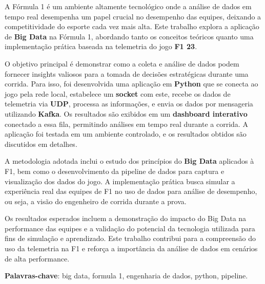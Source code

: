 \documentclass[12pt, %
openright, 
oneside, %
a4paper,    %
brazil]{facom-ufu-abntex2}
\begin{document}
\begin{resumo} %

  A Fórmula 1 é um ambiente altamente tecnológico onde a análise de dados em 
  tempo real desempenha um papel crucial no desempenho das equipes, deixando a competitividade do esporte
  cada vez mais alta. Este trabalho explora a aplicação de \textbf{Big Data} na Fórmula 1, abordando tanto os conceitos teóricos 
  quanto uma implementação prática baseada na telemetria do jogo \textbf{F1 23}.
  
  O objetivo principal é demonstrar como a coleta e análise de dados podem fornecer insights valiosos para 
  a tomada de decisões estratégicas durante uma corrida. Para isso, foi desenvolvida uma aplicação em \textbf{Python} 
  que se conecta ao jogo pela rede local, estabelece um \textbf{socket} com este, recebe os dados de telemetria via \textbf{UDP}, 
  processa as informações, e envia os dados por mensageria utilizando \textbf{Kafka}. Os resultados são exibidos em um 
  \textbf{dashboard interativo} conectado a essa fila, permitindo análises em tempo real durante a corrida. 
  A aplicação foi testada em um ambiente controlado, e os resultados obtidos são discutidos em detalhes.
  
  A metodologia adotada inclui o estudo dos princípios do \textbf{Big Data} aplicados à F1, bem como o desenvolvimento 
  da pipeline de dados para captura e visualização dos dados do jogo. A implementação prática busca simular a experiência 
  real das equipes de F1 no uso de dados para análise de desempenho, ou seja, a visão do engenheiro de corrida durante a prova.

  Os resultados esperados incluem a demonstração do impacto do Big Data na performance das equipes e a 
  validação do potencial da tecnologia utilizada para fins de simulação e aprendizado. Este trabalho contribui 
  para a compreensão do uso da telemetria na F1 e reforça a importância da análise de dados em cenários de alta performance.

 \vspace{\onelineskip}
    
 \noindent
 \textbf{Palavras-chave}: big data, formula 1, engenharia de dados, python, pipeline. %
\end{resumo}

\listoffigures*
\cleardoublepage

\listoftables*
\cleardoublepage
\end{document}
